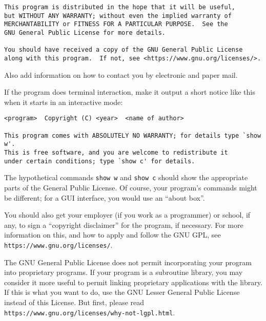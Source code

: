 \documentclass[10pt]{book}
\begin{document}
\begin{enumerate}
{\begin{verbatim}
This program is distributed in the hope that it will be useful,
but WITHOUT ANY WARRANTY; without even the implied warranty of
MERCHANTABILITY or FITNESS FOR A PARTICULAR PURPOSE.  See the
GNU General Public License for more details.

You should have received a copy of the GNU General Public License
along with this program.  If not, see <https://www.gnu.org/licenses/>.
\end{verbatim}
}

Also add information on how to contact you by electronic and paper mail.

If the program does terminal interaction, make it output a short
notice like this when it starts in an interactive mode:

{\footnotesize
\begin{verbatim}
<program>  Copyright (C) <year>  <name of author>

This program comes with ABSOLUTELY NO WARRANTY; for details type `show w'.
This is free software, and you are welcome to redistribute it
under certain conditions; type `show c' for details.
\end{verbatim}
}

The hypothetical commands {\tt show w} and {\tt show c} should show
the appropriate
parts of the General Public License.  Of course, your program's commands
might be different; for a GUI interface, you would use an ``about box''.

You should also get your employer (if you work as a programmer) or
school, if any, to sign a ``copyright disclaimer'' for the program, if
necessary.  For more information on this, and how to apply and follow
the GNU GPL, see \texttt{https://www.gnu.org/licenses/}.

The GNU General Public License does not permit incorporating your
program into proprietary programs.  If your program is a subroutine
library, you may consider it more useful to permit linking proprietary
applications with the library.  If this is what you want to do, use
the GNU Lesser General Public License instead of this License.  But
first, please read \\ \texttt{https://www.gnu.org/licenses/why-not-lgpl.html}.

\end{enumerate}
%
%
\newpage

\

\newpage
{}
\printindex
\newpage \mbox{} \thispagestyle{empty}
\newpage \mbox{} \thispagestyle{empty}
\end{document}
